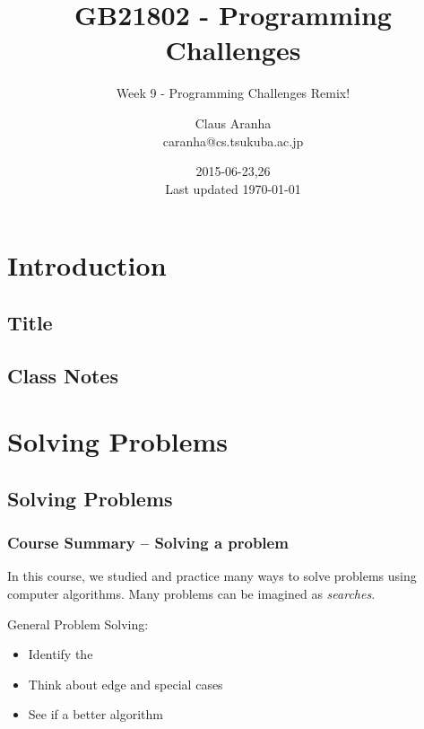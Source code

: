 \documentclass{beamer}
\title[GB21802]{GB21802 - Programming Challenges}
\subtitle[]{Week 9 - Programming Challenges Remix!}
\author[Claus Aranha]{Claus Aranha\\{\footnotesize caranha@cs.tsukuba.ac.jp}}
\institute{College of Information Science}
\date{2015-06-23,26\\{\tiny Last updated \today}}
\begin{document}
\section{Introduction}
\subsection{Title}
\begin{frame}
\maketitle
\end{frame}

\subsection{Class Notes}



\section{Solving Problems}
\subsection{Solving Problems}
\begin{frame}
  \frametitle{Course Summary -- Solving a problem}

  {\smaller
    \begin{block}{}
      In this course, we studied and practice many ways
      to solve problems using computer algorithms. Many
      problems can be imagined as \emph{searches}.
    \end{block}

    \vfill
    
    General Problem Solving:
    \begin{itemize}
    \item Identify the 
    \item Think about edge and special cases
    \item See if a better algorithm 
    \end{itemize}
    
  }
  
\end{frame}
\end{document}

